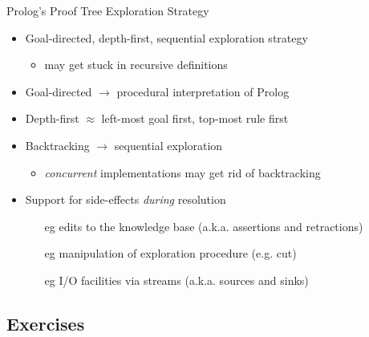 \documentclass[presentation]{beamer}\mode<presentation>{\usetheme{AMSBolognaFC}}
\begin{document}

\begin{frame}{Prolog's Proof Tree Exploration Strategy}
    \begin{itemize}
        \item Goal-directed, depth-first, sequential exploration strategy
        \begin{itemize}
            \item may get stuck in recursive definitions
        \end{itemize}

        \vfill

        \item Goal-directed $\rightarrow$ \alert{procedural} interpretation of Prolog
        
        \vfill

        \item Depth-first $\approx$ \alert{left-most} goal first, \alert{top-most} rule first
        
        \vfill

        \item \alert{Backtracking} $\rightarrow$ sequential exploration
        \begin{itemize}
            \item \emph{concurrent} implementations may get rid of backtracking
        \end{itemize}

        \vfill

        \item Support for \alert{side-effects} \emph{during} resolution
        \begin{itemize}
            \item[eg] edits to the knowledge base (a.k.a. assertions and retractions)
            \item[eg] manipulation of exploration procedure (e.g. cut)
            \item[eg] I/O facilities via streams (a.k.a. sources and sinks) 
        \end{itemize}
    \end{itemize}
\end{frame}

\subsection{Exercises}
\end{document}
